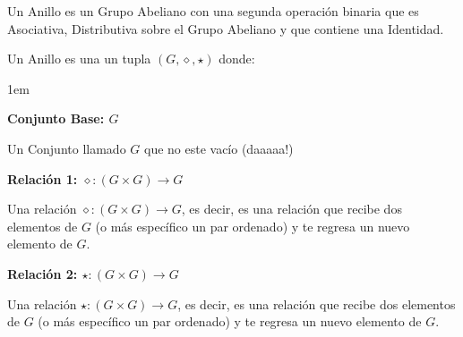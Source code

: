 \documentclass[12pt, fleqn]{report}                             %
\newenvironment{Indentation}[1][0.75em]                         %
        {\begin{adjustwidth}{#1}{}}                                 %
        {\end{adjustwidth}}                                         %
\theoremstyle{break}                                            %
\begin{document}
                Un Anillo es un Grupo Abeliano con una segunda operación binaria que es Asociativa, 
                Distributiva sobre el Grupo Abeliano y que contiene una Identidad.

                Un Anillo es una un tupla $(G, \diamond, \star)$ donde:
                \begin{Indentation}[1em]
                \begin{itemize}
                \small{
                    
                    \item
                        \textbf{Conjunto Base: $G$}

                        Un Conjunto llamado $G$ que no este vacío (daaaaa!)

                    \item
                        \textbf{Relación 1: $\diamond: (G \times  G) \to G$}

                        Una relación $\diamond: (G \times  G) \to G$, es decir, es una relación
                        que recibe dos elementos de $G$ (o más específico un par ordenado) y te
                        regresa un nuevo elemento de $G$.

                    \item
                        \textbf{Relación 2: $\star: (G \times  G) \to G$}

                        Una relación $\star: (G \times  G) \to G$, es decir, es una relación
                        que recibe dos elementos de $G$ (o más específico un par ordenado) y te
                        regresa un nuevo elemento de $G$.
                }
                \end{itemize}
                \end{Indentation}
\end{document}

